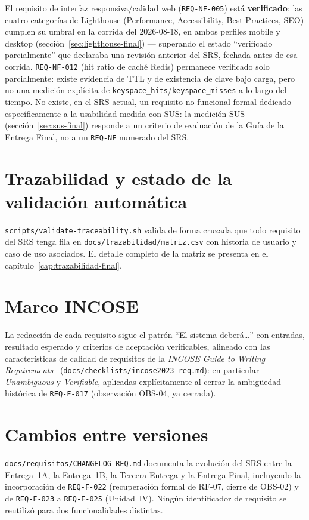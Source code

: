 El requisito de interfaz responsiva/calidad web (\texttt{REQ-NF-005}) est\'a
\textbf{verificado}: las cuatro categor\'ias de Lighthouse (Performance,
Accessibility, Best Practices, SEO) cumplen su umbral en la corrida del
2026-08-18, en ambos perfiles mobile y desktop
(secci\'on~\ref{sec:lighthouse-final}) --- superando el estado
``verificado parcialmente'' que declaraba una revisi\'on anterior del SRS,
fechada antes de esa corrida. \texttt{REQ-NF-012} (hit ratio de cach\'e
Redis) permanece verificado solo parcialmente: existe evidencia de TTL y
de existencia de clave bajo carga, pero no una medici\'on expl\'icita de
\texttt{keyspace\_hits}/\texttt{keyspace\_misses} a lo largo del tiempo.
No existe, en el SRS actual, un requisito no funcional formal dedicado
espec\'ificamente a la usabilidad medida con SUS: la medici\'on SUS
(secci\'on~\ref{sec:sus-final}) responde a un criterio de evaluaci\'on de
la Gu\'ia de la Entrega Final, no a un \texttt{REQ-NF} numerado del SRS.

\section{Trazabilidad y estado de la validaci\'on autom\'atica}

\texttt{scripts/validate-traceability.sh} valida de forma cruzada que todo
requisito del SRS tenga fila en \texttt{docs/trazabilidad/matriz.csv} con
historia de usuario y caso de uso asociados. El detalle completo de la
matriz se presenta en el cap\'itulo~\ref{cap:trazabilidad-final}.

\section{Marco INCOSE}

La redacci\'on de cada requisito sigue el patr\'on ``El sistema
deber\'a\ldots'' con entradas, resultado esperado y criterios de
aceptaci\'on verificables, alineado con las caracter\'isticas de calidad de
requisitos de la \emph{INCOSE Guide to Writing Requirements}~\cite{incose2023requirements}
(\texttt{docs/checklists/incose2023-req.md}): en particular
\emph{Unambiguous} y \emph{Verifiable}, aplicadas expl\'icitamente al
cerrar la ambig\"uedad hist\'orica de \texttt{REQ-F-017} (observaci\'on
OBS-04, ya cerrada).

\section{Cambios entre versiones}

\texttt{docs/requisitos/CHANGELOG-REQ.md} documenta la evoluci\'on del SRS
entre la Entrega~1A, la Entrega~1B, la Tercera Entrega y la Entrega Final,
incluyendo la incorporaci\'on de \texttt{REQ-F-022} (recuperaci\'on formal
de RF-07, cierre de OBS-02) y de \texttt{REQ-F-023} a \texttt{REQ-F-025}
(Unidad~IV). Ning\'un identificador de requisito se reutiliz\'o para dos
funcionalidades distintas.
